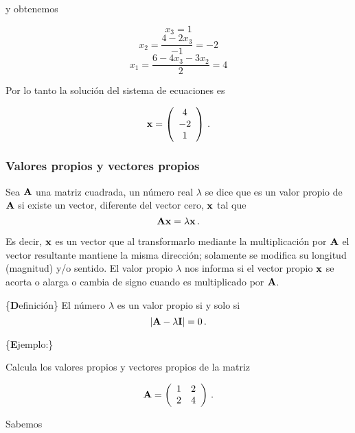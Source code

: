 \documentclass[
]{agujournal2019}
\begin{document}
y obtenemos

\[x_3=1\] \[x_2=\frac{4-2x_3}{-1}=-2\] \[x_1=\frac{6-4x_3-3x_2}{2}=4\]

Por lo tanto la solución del sistema de ecuaciones es

\[{\textbf x}=\left(\begin{array}{c}
  4 \\
  -2\\
  1 \\
        \end{array}\right)\,.\]

\vspace{0.5cm}

\hypertarget{valores-propios-y-vectores-propios}{%
\subsubsection{Valores propios y vectores
propios}\label{valores-propios-y-vectores-propios}}

Sea \({\textbf A}\) una matriz cuadrada, un número real \(\lambda\) se
dice que es un valor propio de \({\textbf A}\) si existe un vector,
diferente del vector cero, \({\textbf x}\) tal que
\[{\textbf A}{\textbf x}=\lambda{\textbf x}\,.\]

\noindent Es decir, \({\textbf x}\) es un vector que al transformarlo
mediante la multiplicación por \({\textbf A}\) el vector resultante
mantiene la misma dirección; solamente se modifica su longitud
(magnitud) y/o sentido. El valor propio \(\lambda\) nos informa si el
vector propio \({\textbf x}\) se acorta o alarga o cambia de signo
cuando es multiplicado por \({\textbf A}\).

\vspace{0.5cm}

\{\noindent \textbf Definición\} El número \(\lambda\) es un valor
propio si y solo si \[|{\textbf A}-\lambda{\textbf I}|=0\,.\]

\vspace{0.5cm}

\{\noindent \textbf Ejemplo:\}

\noindent Calcula los valores propios y vectores propios de la matriz

\[{\textbf A}=\left(\begin{array}{ccccc}
  1 & 2\\
  2 & 4\\
        \end{array}\right)\,.\]

Sabemos
\end{document}
